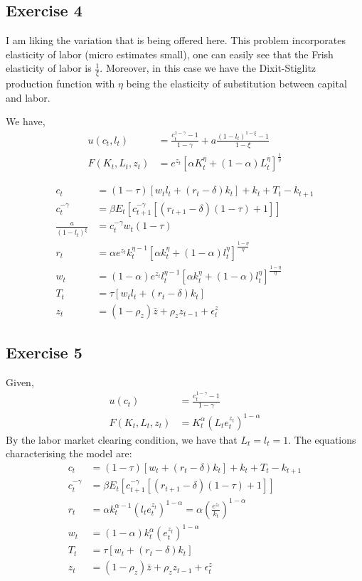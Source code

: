 \documentclass[12pt]{article}
\begin{document}
\subsection*{Exercise 4}
I am liking the variation that is being offered here. This problem incorporates elasticity of labor (micro estimates small), one can easily see that the Frish elasticity of labor is $\frac{1}{\xi}$. Moreover, in this case we have the Dixit-Stiglitz production function with $\eta$ being the elasticity of substitution between capital and labor.

We have,
\begin{align*}
u(c_t, l_t) &= \frac{c_t^{1-\gamma} - 1}{1- \gamma} + a \frac{(1 - l_t)^{1 - \xi}-1}{1 - \xi} \\
F(K_t, L_t, z_t) &= e^{z_t}[\alpha K^{\eta}_t + (1 - \alpha)L^{\eta}_t]^{\frac{1}{\eta	}}
\end{align*}


\begin{align}
c_t &= (1 - \tau)[w_tl_t + (r_t -\delta)k_t] + k_t + T_t - k_{t+1} \\
c_t ^{-\gamma} &= \beta E_t\left[ c_{t+1}^{-\gamma} [(r_{t+1} - \delta)(1 - \tau) + 1]\right] \\
\frac{a}{(1-l_t)^{\xi}} &= c_t ^{-\gamma} w_t (1-\tau) \\
r_t &= \alpha e^{z_t} k_t^{\eta - 1} [\alpha k_t^{\eta} + (1 - \alpha) l_t^{\eta}]^{\frac{1 - \eta}{\eta}} \\
w_t &= (1 - \alpha) e^{z_t} l_t^{\eta - 1} [\alpha k_t^{\eta} + (1 - \alpha) l_t^{\eta}]^{\frac{1 - \eta}{\eta}} \\
T_t &= \tau[w_tl_t + (r_t - \delta)k_t] \\
z_t &= (1-\rho_z)\bar{z} + \rho_z z_{t-1} + \epsilon^z_t
\end{align}

\subsection*{Exercise 5}
Given,
\begin{align*}
u(c_t) &= \frac{c_t^{1-\gamma} - 1}{1- \gamma} \\
F(K_t, L_t, z_t) &= K_t^{\alpha} (L_t e_t^{z_t})^{1 - \alpha}
\end{align*}
 By the labor market clearing condition, we have that $L_t = l_t = 1$. The equations characterising the model are:
\begin{align}
c_t &= (1 - \tau)[w_t + (r_t - \delta)k_t] + k_t + T_t - k_{t+1} \\
c_t ^{-\gamma} &= \beta E_t \left[ c_{t+1}^{-\gamma} [(r_{t+1} - \delta)(1 - \tau) + 1] \right] \\
r_t &= \alpha k_t ^{\alpha - 1} (l_t e_t^{z_t})^{1 - \alpha} = \alpha \left(\frac{e^{z_t}}{k_t} \right)^{1 - \alpha} \\
w_t &= (1 - \alpha) k_t ^{\alpha} (e_t^{z_t})^{1 - \alpha} \\
T_t &= \tau [w_t + (r_t - \delta)k_t ] \\
z_t &= (1 - \rho_z)\bar{z} + \rho_z z_{t-1} + \epsilon^z_t  
\end{align}
\end{document}
